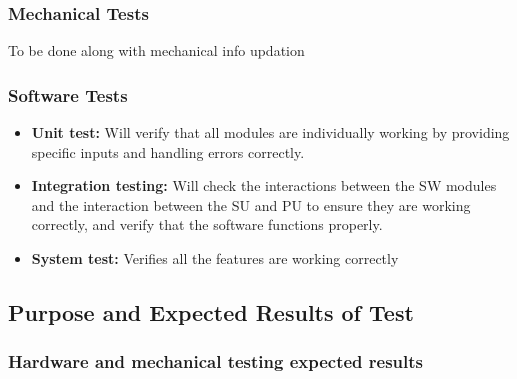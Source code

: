 \documentclass[a4paper,12pt]{article}
\begin{document}
	\subsubsection{Mechanical Tests}
	To be done along with mechanical info updation
	\subsubsection{Software Tests}
		\begin{itemize}
			\item \textbf{Unit test:}
			Will verify that all modules are individually working by providing specific inputs and handling errors correctly.
			\item \textbf{Integration testing:}
			Will check the interactions between the SW modules and the interaction between the SU and PU to ensure they are working correctly, and verify that the software functions properly.
			\item \textbf{System test:}
			Verifies all the features are working correctly 
		
		\end{itemize}

	 
	\subsection{Purpose and Expected Results of Test}
	
	\subsubsection{Hardware and mechanical testing expected results}
\end{document}
